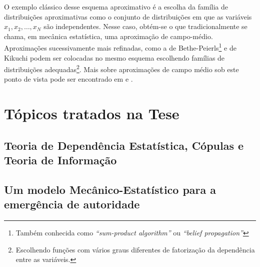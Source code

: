 O exemplo clássico desse esquema aproximativo é a escolha da família de distribuições aproximativas como o conjunto de distribuições em que as variáveis $x_1, x_2, \ldots, x_N$ são independentes. Nesse caso, obtém-se o que tradicionalmente se chama, em mecânica estatística, uma aproximação de campo-médio. Aproximações sucessivamente mais refinadas, como a de Bethe-Peierls\footnote{Também conhecida como \emph{``sum-product algorithm''} ou \emph{``belief propagation''} } e de Kikuchi podem ser colocadas no mesmo esquema escolhendo famílias de distribuições adequadas\footnote{Escolhendo funções com vários graus diferentes de fatorização da dependência entre as variáveis.}. Mais sobre aproximações de campo médio sob este ponto de vista pode ser encontrado em \citet{Opper2001}\cite{Opper2001} e \citet{Mezard2009}\cite{Mezard2009}.

\section{Tópicos tratados na Tese}

\subsection{Teoria de Dependência Estatística, Cópulas e Teoria de Informação}
\subsection{Um modelo Mecânico-Estatístico para a emergência de autoridade}
